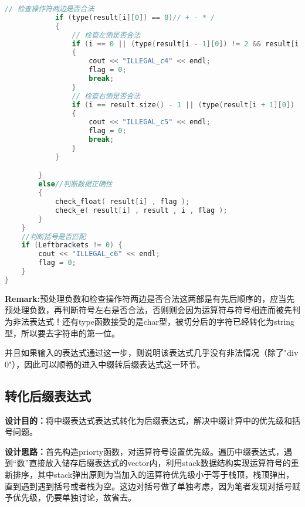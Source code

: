 \documentclass[fontset=fandol]{ctexart}
\begin{document}
\begin{lstlisting}[language=C++, caption={check\_expressor()}]
            // 检查操作符两边是否合法
            if (type(result[i][0]) == 0)// + - * /
            {
                // 检查左侧是否合法
                if (i == 0 || (type(result[i - 1][0]) != 2 && result[i - 1] != ")")) 
                {
                    cout << "ILLEGAL_c4" << endl;
                    flag = 0;
                    break;
                }
                // 检查右侧是否合法
                if (i == result.size() - 1 || (type(result[i + 1][0]) != 2 && result[i + 1] != "(")) 
                {
                    cout << "ILLEGAL_c5" << endl;
                    flag = 0;
                    break;
                }
            }

        }
        else//判断数据正确性
        {
            check_float( result[i] , flag );
            check_e( result[i] , result , i , flag );
        }
    }
    //判断括号是否匹配
    if (Leftbrackets != 0) {
        cout << "ILLEGAL_c6" << endl;
        flag = 0;
    }
}
\end{lstlisting}
\textbf{Remark:}预处理负数和检查操作符两边是否合法这两部是有先后顺序的，应当先预处理负数，再判断符号左右是否合法，否则则会因为运算符与符号相连而被先判为非法表达式！还有type函数接受的是char型，被切分后的字符已经转化为string型，所以要去字符串的第一位。

并且如果输入的表达式通过这一步，则说明该表达式几乎没有非法情况（除了"div 0"），因此可以顺畅的进入中缀转后缀表达式这一环节。
\subsection{转化后缀表达式}
\textbf{设计目的：}将中缀表达式表达式转化为后缀表达式，解决中缀计算中的优先级和括号问题。

\textbf{设计思路：}首先构造priorty函数，对运算符号设置优先级。遍历中缀表达式，遇到“数”直接放入储存后缀表达式的vector内，利用stack数据结构实现运算符号的重新排序，其中stack弹出原则为当加入的运算符优先级小于等于栈顶，栈顶弹出，直到遇到遇到括号或者栈为空。这边对括号做了单独考虑，因为笔者发现对括号赋予优先级，仍要单独讨论，故省去。
\end{document}
